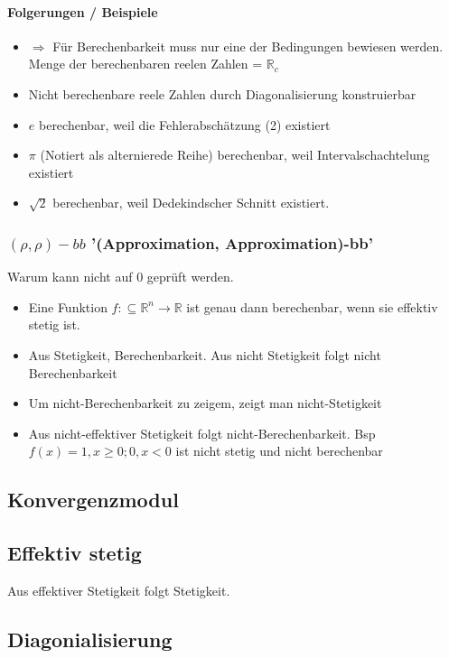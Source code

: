 \documentclass[ngerman]{scrartcl}
\begin{document}
 \paragraph{Folgerungen / Beispiele}
\begin{itemize}
  \item $ \Rightarrow $ Für Berechenbarkeit muss nur eine der Bedingungen bewiesen werden. Menge der berechenbaren reelen Zahlen = $ \mathbb{R}_c $
  \item Nicht berechenbare reele Zahlen durch Diagonalisierung konstruierbar
  \item $ e $ berechenbar, weil die Fehlerabschätzung (2) existiert
  \item $ \pi $ (Notiert als alternierede Reihe) berechenbar, weil Intervalschachtelung existiert
  \item $ \sqrt{2} $ berechenbar, weil Dedekindscher Schnitt existiert.
 \end{itemize}

\subsubsection{$ (\rho, \rho)-bb $ '(Approximation, Approximation)-bb'}
Warum kann nicht auf 0 geprüft werden.
\begin{itemize}
  \item Eine Funktion $ f: \subseteq \mathbb{R}^n \rightarrow \mathbb{R} $ ist genau dann berechenbar, wenn sie effektiv stetig ist.
  \item Aus Stetigkeit, Berechenbarkeit. Aus nicht Stetigkeit folgt nicht Berechenbarkeit
  \item Um nicht-Berechenbarkeit zu zeigem, zeigt man nicht-Stetigkeit 
  \item Aus nicht-effektiver Stetigkeit folgt nicht-Berechenbarkeit. Bsp $  f(x) = 1, x \geq 0; 0, x < 0 $ ist nicht stetig und nicht berechenbar
\end{itemize}


\subsection{Konvergenzmodul}

\subsection{Effektiv stetig}
Aus effektiver Stetigkeit folgt Stetigkeit. 
\subsection{Diagonialisierung}
\end{document}
